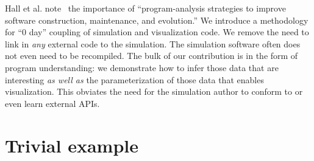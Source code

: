 




Hall et al. note~\cite{Hall:2009:Next50} the importance of ``program-analysis
strategies to improve software construction, maintenance, and
evolution.''  We introduce a methodology for ``0 day'' coupling of
simulation and visualization code.  We remove the need
to link in \emph{any} external code to the simulation.  The simulation
software often does not even need to be recompiled.  The bulk of our
contribution is in the form of program understanding: we demonstrate how to
infer those data that
are interesting \emph{as well as} the parameterization of those data
that enables visualization.  This obviates the need for the simulation
author to conform to or even learn external APIs.

\section{Trivial example}

